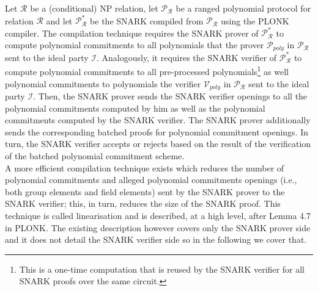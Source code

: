 \noindent Let $\mathcal{R}$ be a (conditional) NP relation, let $\mathscr{P}_{\mathcal{R}}$ be a ranged polynomial protocol for 
relation $\mathcal{R}$ and let $\mathscr{P}^*_{\mathcal{R}}$ be the SNARK compiled from $\mathscr{P}_{\mathcal{R}}$ using the PLONK compiler.  
The compilation technique requires the SNARK prover of  $\mathscr{P}^*_{\mathcal{R}}$ to compute 
polynomial commitments to all polynomials that the prover $\mathcal{P}_{poly}$ in $\mathscr{P}_{\mathcal{R}}$ sent to the ideal party $\mathcal{I}$. Analogously, 
it requires the SNARK verifier of $\mathscr{P}^*_{\mathcal{R}}$ to compute polynomial commitments to all pre-processed polynomials\footnote{This is a one-time computation that is 
reused by the SNARK verifier for all SNARK proofs over the same circuit.} as well polynomial commitments to polynomials the verifier $\mathcal{V}_{poly}$ 
in $\mathscr{P}_{\mathcal{R}}$ sent to the ideal party $\mathcal{I}$. Then, the SNARK prover sends the SNARK verifier openings to 
all the polynomial commitments computed by him as well as the polynomial commitments computed by the SNARK verifier. The SNARK 
prover additionally sends the corresponding batched proofs for polynomial commitment openings. In turn, the SNARK verifier accepts or rejects based 
on the result of the verification of the batched polynomial commitment scheme. \\

\noindent A more efficient compilation technique exists which reduces the number of polynomial commitments and alleged polynomial commitments openings 
(i.e., both group elements and field elements) sent by the SNARK prover to the SNARK verifier; this, in turn, reduces the size of the SNARK proof. 
This technique is called linearisation and is described, at a high level, after Lemma 4.7 in PLONK. The existing description however covers only the 
SNARK prover side and it does not detail the SNARK verifier side so in the following we cover that. \\


